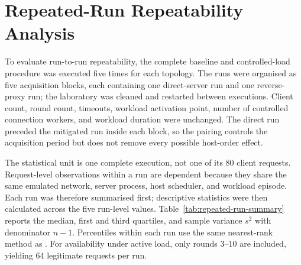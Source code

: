 \section{Repeated-Run Repeatability Analysis}
\label{sec:repeated-run-validation}

To evaluate run-to-run repeatability, the complete baseline and controlled-load
procedure was executed five times for each topology. The runs were organised
as five acquisition blocks, each containing one direct-server run and one
reverse-proxy run; the laboratory was cleaned and restarted between
executions. Client count, round count, timeouts, workload activation point,
number of controlled connection workers, and workload duration were unchanged.
The direct run preceded the mitigated run inside each block, so the pairing
controls the acquisition period but does not remove every possible host-order
effect.

The statistical unit is one complete execution, not one of its 80 client
requests. Request-level observations within a run are dependent because they
share the same emulated network, server process, host scheduler, and workload
episode. Each run was therefore summarised first; descriptive statistics were
then calculated across the five run-level values. Table~\ref{tab:repeated-run-summary}
reports the median, first and third quartiles, and sample variance $s^2$ with
denominator $n-1$. Percentiles within each run use the same nearest-rank method
as . For availability under active load, only
rounds 3--10 are included, yielding 64 legitimate requests per run.

